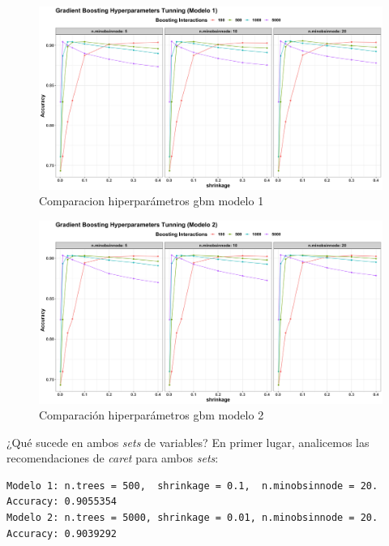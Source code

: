 \documentclass[
]{article}
\begin{document}
\begin{figure}[h!]

{\centering \includegraphics[width=0.99\linewidth,height=0.99\textheight,]{./charts/gradient_boosting/05_gbm_hyperparameters_modelo1} 

}

\caption{Comparacion hiperparámetros gbm modelo 1}\label{fig:unnamed-chunk-107}
\end{figure}
\begin{figure}[h!]

{\centering \includegraphics[width=0.99\linewidth,height=0.99\textheight,]{./charts/gradient_boosting/05_gbm_hyperparameters_modelo2} 

}

\caption{Comparación hiperparámetros gbm modelo 2}\label{fig:unnamed-chunk-108}
\end{figure}

¿Qué sucede en ambos \emph{sets} de variables? En primer lugar,
analicemos las recomendaciones de \emph{caret} para ambos \emph{sets}:

\begin{verbatim}
Modelo 1: n.trees = 500,  shrinkage = 0.1,  n.minobsinnode = 20. Accuracy: 0.9055354
Modelo 2: n.trees = 5000, shrinkage = 0.01, n.minobsinnode = 20. Accuracy: 0.9039292
\end{verbatim}
\end{document}
